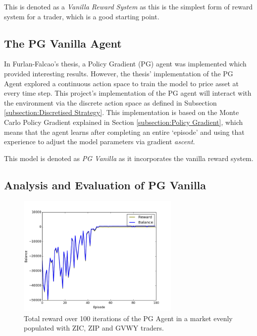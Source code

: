 \documentclass[ %
                    author={Ashwinder Khurana},
                supervisor={Prof Dave Cliff},
                    degree={MEng},
                     title={The Deeply Reinforced Trader},
                  subtitle={},
                      type={enterprise},
                      year={2020} ]{dissertation}
\begin{document}
{\noindent
This is denoted as a \textit{Vanilla Reward System} as this is the simplest form of reward system for a trader, which is a good starting point. 

\subsection{The PG Vanilla Agent}
In Furlan-Falcao's thesis, a Policy Gradient (PG) agent was implemented which provided interesting results. However, the thesis' implementation of the PG Agent explored a continuous action space to train the model to price asset at every time step. This project's implementation of the PG agent will interact with the environment via the discrete action space as defined in Subsection \ref{subsection:Discretised Strategy}. This implementation is based on the Monte Carlo Policy Gradient explained in Section \ref{subsection:Policy Gradient}, which means that the agent learns after completing an entire \enquote*{episode} and using that experience to adjust the model parameters via gradient \textit{ascent}.
 
\noindent 
This model is denoted as \textit{PG Vanilla} as it incorporates the vanilla reward system. 
\subsection{Analysis and Evaluation of PG Vanilla}
\label{subsection:Analysis and Evaluation of PG Vanilla}

\begin{figure}[H]
	\centering
  	\includegraphics[width=0.7\textwidth]{PG-Vanilla-Reward.png}
  	\caption{Total reward over 100 iterations of the PG Agent in a market evenly populated with ZIC, ZIP and GVWY traders. }
	\label{fig:PG-Vanilla-Reward}  
\end{figure}

}
\end{document}
